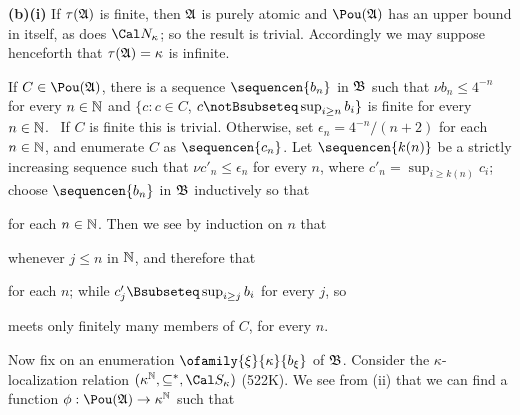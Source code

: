 {\medskip

{\bf (b)(i)} If $\tau(\frak A)$ is finite,
then $\frak A$ is purely atomic and
$\Pou(\frak A)$ has an upper bound in itself,
as does $\Cal N_{\kappa}$;  so the
result is trivial.   Accordingly we may suppose henceforth that
$\tau(\frak A)=\kappa$ is infinite.

\medskip

 If $C\in\Pou(\frak A)$,
there is a sequence $\sequencen{b_n}$ in $\frak B$ such
that $\nu b_n\le 4^{-n}$ for every $n\in\Bbb N$ and
$\{c:c\in C$, $c\notBsubseteq\sup_{i\ge n}b_i\}$ is finite for every
$n\in\Bbb N$.   \Prf\ If $C$ is finite this is trivial.   Otherwise,
set $\epsilon_n=4^{-n}/(n+2)$ for each $n\in\Bbb N$, and
enumerate $C$ as $\sequencen{c_n}$.   Let $\sequencen{k(n)}$ be a strictly
increasing sequence such that $\nu c'_n\le\epsilon_n$ for every $n$, where
$c'_n=\sup_{i\ge k(n)}c_i$;  choose $\sequencen{b_n}$ in $\frak B$
inductively so that


\noindent for each $n\in\Bbb N$.   Then we see by induction on $n$ that


\noindent whenever $j\le n$ in $\Bbb N$, and therefore that


\noindent for each $n$;  while $c'_j\Bsubseteq\sup_{i\ge j}b_i$ for every
$j$, so


\noindent meets only finitely many members of $C$, for every $n$.\ \Qed

\medskip

 Now fix on an enumeration $\ofamily{\xi}{\kappa}{b_{\xi}}$
of $\frak B$.   Consider the $\kappa$-localization relation
$(\kappa^{\Bbb N},\subseteq^*,\Cal S_{\kappa})$ (522K).
We see from (ii) that we can find a function
$\phi:\Pou(\frak A)\to\kappa^{\Bbb N}$ such that



}
